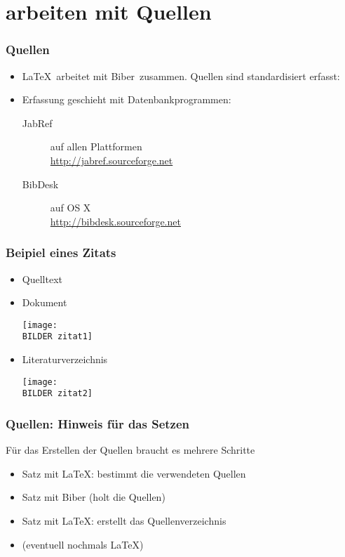 \documentclass[11pt,german,aspectratio=169]{beamer}
\def\myColor{blue!80!white!70!green}                %
\newcommand{\thisColor}[1]{{\color{\myColor}#1}}    %
\def\BILDER{../Bilder/} %
\begin{document}
\section{arbeiten mit Quellen}
\frame
{
	\frametitle{Quellen}
	\begin{itemize}
		\item \LaTeX\ arbeitet mit \thisColor{Biber}\ zusammen. Quellen sind standardisiert erfasst:
	
	\item Erfassung geschieht mit Datenbankprogrammen:
		\begin{description}
			\item[JabRef] auf allen Plattformen \\
			
		\url{http://jabref.sourceforge.net}
			\item[BibDesk] auf OS X	\\ \url{http://bibdesk.sourceforge.net}		
		\end{description}
	\end{itemize}
	
}
\frame
{
	\frametitle{Beipiel eines Zitats}
	\begin{itemize}
		\item Quelltext \\
			
		\item Dokument \\
		 	\begin{center}
		 \texttt{[image: \\BILDER zitat1]}
		 \end{center}
		\item Literaturverzeichnis \\
		 	\begin{center}
		 \texttt{[image: \\BILDER zitat2]}
		 
		 	\end{center}
		
		
	\end{itemize}
}
\frame
{
	\frametitle{Quellen: Hinweis für das Setzen}
	
	Für das Erstellen der Quellen braucht es mehrere Schritte
	\begin{itemize}
		\item Satz mit \thisColor{\LaTeX}: bestimmt die verwendeten Quellen
		\item Satz mit \thisColor{Biber} (holt die Quellen)
		\item Satz mit \thisColor{\LaTeX}: erstellt das Quellenverzeichnis
		\item (eventuell nochmals \thisColor{\LaTeX})
		
	\end{itemize}
}
\end{document}
